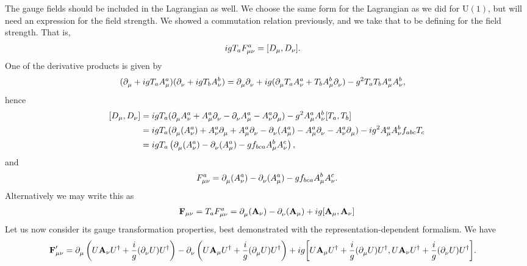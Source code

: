 The gauge fields should be included in the Lagrangian as well. We choose the same form for the Lagrangian as we did for $\text{U}(1)$, but will need an expression for the field strength. We showed a commutation relation previously, and we take that to be defining for the field strength. That is,
\begin{align*}
	igT_{a}F_{\mu\nu}^{a} &= \comm{D_{\mu}}{D_{\nu}}.
\end{align*}
One of the derivative products is given by
\begin{align*}
	(\partial^{}_{\mu} + igT_{a}A_{\mu}^{a})(\partial^{}_{\nu} + igT_{b}A_{\nu}^{b}) &= \partial^{}_{\mu}\partial^{}_{\nu} + ig(\partial^{}_{\mu}T_{a}A_{\nu}^{a} + T_{b}A_{\mu}^{b}\partial^{}_{\nu}) - g^{2}T_{a}T_{b}A_{\mu}^{a}A_{\nu}^{b},
\end{align*}
hence
\begin{align*}
	\comm{D_{\mu}}{D_{\nu}} &= igT_{a}(\del{}{\mu}A_{\nu}^{a} + A_{\mu}^{a}\del{}{\nu} - \del{}{\nu}A_{\mu}^{a} - A_{\nu}^{a}\del{}{\mu}) - g^{2}A_{\mu}^{a}A_{\nu}^{b}\comm{T_{a}}{T_{b}} \\
	                        &= igT_{a}(\del{}{\mu}(A_{\nu}^{a}) + A_{\nu}^{a}\del{}{\mu}  + A_{\mu}^{a}\del{}{\nu} - \del{}{\nu}(A_{\mu}^{a}) - A_{\mu}^{a}\del{}{\nu} - A_{\nu}^{a}\del{}{\mu}) - ig^{2}A_{\mu}^{a}A_{\nu}^{b}f_{abc}T_{c} \\
	                        &= igT_{a}\left(\del{}{\mu}(A_{\nu}^{a}) - \del{}{\nu}(A_{\mu}^{a}) - gf_{bca}A_{\mu}^{b}A_{\nu}^{c}\right),
\end{align*}
and
\begin{align*}
	F_{\mu\nu}^{a} = \partial^{}_{\mu}(A_{\nu}^{a}) - \partial^{}_{\nu}(A_{\mu}^{a}) - gf_{bca}A_{\mu}^{b}A_{\nu}^{c}.
\end{align*}
Alternatively we may write this as
\begin{align*}
	\textbf{F}_{\mu\nu} = T_{a}F^{a}_{\mu\nu} = \del{}{\mu}(\textbf{A}_{\nu}) - \del{}{\nu}(\textbf{A}_{\mu}) + ig\comm{\textbf{A}_{\mu}}{\textbf{A}_{\nu}}
\end{align*}
Let us now consider its gauge transformation properties, best demonstrated with the representation-dependent formalism. We have
\begin{align*}
	\textbf{F}_{\mu\nu}\p &= \del{}{\mu}\left(U\textbf{A}_{\nu}U\adj + \frac{i}{g}(\del{}{\nu}U)U\adj\right) - \del{}{\nu}\left(U\textbf{A}_{\mu}U\adj + \frac{i}{g}(\del{}{\mu}U)U\adj\right) + ig\comm{U\textbf{A}_{\mu}U\adj + \frac{i}{g}(\del{}{\mu}U)U\adj}{U\textbf{A}_{\nu}U\adj + \frac{i}{g}(\del{}{\nu}U)U\adj}.
\end{align*}
